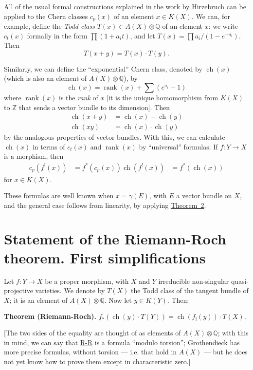 \documentclass{article}
\newenvironment{itenv}[1]
  {\phantomsection\par\medskip\noindent\textbf{#1.}\itshape}
  {\medskip}
\DeclareMathOperator{\ch}{ch}
\DeclareMathOperator{\rank}{rank}
\newcommand{\oldpage}[1]{\marginpar{\footnotesize$\Big\vert$ \textit{p.~#1}}}
\begin{document}
All of the usual formal constructions explained in the work by Hirzebruch \cite{9} can be applied to the Chern classes $c_p(x)$ of an element $x\in K(X)$.
We can, for example, define the \emph{Todd class $T(x)\in A(X)\otimes\mathbb{Q}$} of an element $x$:
we write $c_t(x)$ formally in the form $\prod(1+a_it)$, and let $T(x)=\prod a_i/(1-e^{-a_i})$.
Then
\[
  T(x+y) = T(x)\cdot T(y).
\]

Similarly, we can define the ``exponential'' Chern class, denoted by $\ch(x)$ (which is also an element of $A(X)\otimes\mathbb{Q}$), by
\[
  \ch(x) = \rank(x)+\sum(e^{a_i}-1)
\]
where $\rank(x)$ is the \emph{rank} of $x$ [it is the unique homomorphism from $K(X)$ to $\mathbb{Z}$ that sends a vector bundle to its dimension].
Then
\[
  \begin{aligned}
    \ch(x+y) &= \ch(x)+\ch(y)
  \\\ch(xy) &= \ch(x)\cdot\ch(y)
  \end{aligned}
\]
by the analogous properties of vector bundles.
With this, we can calculate $\ch(x)$ in terms of $c_t(x)$ and $\rank(x)$ by ``universal'' formulas.
If $f\colon Y\to X$ is a morphism, then
\[
  \begin{aligned}
    c_p(f^!(x)) &= f^*(c_p(x))
    \ch(f^!(x)) &= f^*(\ch(x))
  \end{aligned}
\]
for $x\in K(X)$.

These formulas are well known when $x=\gamma(E)$, with $E$ a vector bundle on $X$, and the general case follows from linearity, by applying \hyperref[theorem2]{Theorem~2}.


\section{Statement of the Riemann-Roch theorem. First simplifications}
\label{section7}

\oldpage{113}
Let $f\colon Y\to X$ be a proper morphism, with $X$ and $Y$ irreducible non-singular quasi-projective varieties.
We denote by $T(X)$ the Todd class of the tangent bundle of $X$;
it is an element of $A(X)\otimes\mathbb{Q}$.
Now let $y\in K(Y)$.
Then:

\begin{itenv}{Theorem (Riemann-Roch)}
\label{theoremriemannroch}
  $f_*(\ch(y)\cdot T(Y)) = \ch(f_!(y))\cdot T(X)$.
\end{itenv}

[The two sides of the equality are thought of as elements of $A(X)\otimes\mathbb{Q}$;
with this in mind, we can say that \hyperref[theoremriemannroch]{R-R} is a formula ``modulo torsion'';
Grothendieck has more precise formulas, without torsion --- i.e. that hold in $A(X)$ --- but he does not yet know how to prove them except in characteristic zero.]
\end{document}
